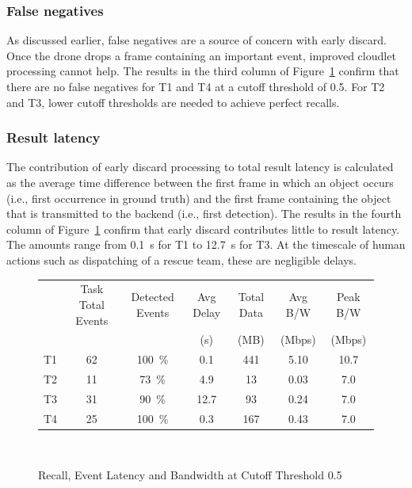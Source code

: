 \subsubsection{False negatives}
As discussed earlier, false negatives are
a source of concern with early discard.  Once the drone drops a frame
containing an important event, improved cloudlet processing cannot help. The
results in the third column of Figure~\ref{fig:early-discard-results} confirm
that there are no false negatives for T1 and T4 at a cutoff threshold of 0.5.
For T2 and T3, lower cutoff thresholds are needed to achieve perfect recalls.

\subsubsection{Result latency}
The contribution of early discard processing to total result latency
is calculated as the average time difference between the first frame
in which an object occurs (i.e., first occurrence in ground truth) and
the first frame containing the object that is transmitted to the
backend (i.e., first detection).  The results in the fourth column of
Figure~\ref{fig:early-discard-results} confirm that early discard
contributes little to result latency.  The amounts range from 0.1~s
for T1 to 12.7~s for T3.  At the timescale of human actions
such as dispatching of a rescue team, these are negligible delays.

\begin{figure}
\centering
\begin{tabular}{|c|c|c|c|c|c|c|}
\hline
   &Task Total Events   &Detected Events       &Avg Delay & Total Data &Avg B/W &Peak B/W\\
   & & &(s)&(MB)&(Mbps)&(Mbps)\\ 

\hline
T1 & \phantom{0}62  & 100~\%       &  \phantom{0}0.1&\phantom{0}441  &  5.10     &   10.7  \\
\hline
T2 & \phantom{0}11  & \phantom{0}73~\%      & \phantom{0}4.9 & \phantom{00}13            &  0.03 & \phantom{0}7.0 \\ %
\hline
T3 & \phantom{0}31  & \phantom{0}90~\%  & 12.7 & \phantom{00}93  &  0.24 &  \phantom{0}7.0 \\ %
\hline
T4 & \phantom{0}25  & 100~\%       & \phantom{0}0.3 & \phantom{0}167  &  0.43 &  \phantom{0}7.0 \\
\hline
\end{tabular}\\
\caption{Recall, Event Latency and Bandwidth at Cutoff Threshold 0.5}
\label{fig:early-discard-results}
\end{figure}


